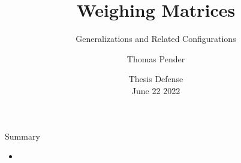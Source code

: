 \documentclass{beamer}
\title[Splittable ODs]{Weighing Matrices}
\subtitle{Generalizations and Related Configurations}
\author[T. Pender]{Thomas Pender}
\institute[U of L]{Department of Mathematics and Computer Science\\University of
Lethbridge}
\date[06/22/2022]{Thesis Defense\\June 22 2022}
\begin{document}

\begin{frame}

  \titlepage
\end{frame}

\begin{frame}{Summary}

  \begin{itemize}
    \item 
  \end{itemize}
  
\end{frame}

\end{document}
